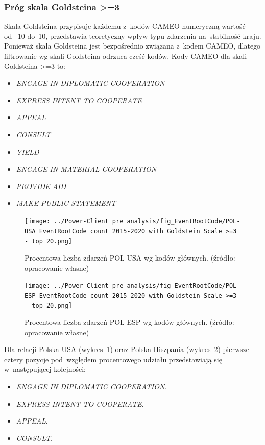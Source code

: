 \documentclass[11pt]{report}
\begin{document}
    \subsubsection{Próg skala Goldsteina >=3}
    Skala Goldsteina przypisuje każdemu z~kodów CAMEO numeryczną wartość od~-10 do~10, przedstawia teoretyczny wpływ typu zdarzenia na~stabilność kraju.
    Ponieważ skala Goldsteina jest bezpośrednio związana z~kodem CAMEO, dlatego filtrowanie wg skali Goldsteina odrzuca cześć kodów.
    Kody CAMEO dla skali Goldsteina >=3 to:
    \begin{itemize}
        \item \textit{ENGAGE IN DIPLOMATIC COOPERATION}
        \item \textit{EXPRESS INTENT TO COOPERATE}
        \item \textit{APPEAL}
        \item \textit{CONSULT}
        \item \textit{YIELD}
        \item \textit{ENGAGE IN MATERIAL COOPERATION}
        \item \textit{PROVIDE AID}
        \item \textit{MAKE PUBLIC STATEMENT}
    \end{itemize}

    \begin{figure}[tp]
        \centering
        \texttt{[image: ../Power-Client pre analysis/fig\_EventRootCode/POL-USA EventRootCode count 2015-2020 with Goldstein Scale >=3 - top 20.png]}
        \caption{Procentowa liczba zdarzeń POL-USA wg kodów głównych. (źródło: opracowanie własne)}
        \label{fig:Power-Client:ERC:Goldstein:POL-USA}
    \end{figure}


    \begin{figure}[tp]
        \centering
        \texttt{[image: ../Power-Client pre analysis/fig\_EventRootCode/POL-ESP EventRootCode count 2015-2020 with Goldstein Scale >=3 - top 20.png]}
        \caption{Procentowa liczba zdarzeń POL-ESP wg kodów głównych. (źródło: opracowanie własne)}
        \label{fig:Power-Client:ERC:Goldstein:POL-ESP}
    \end{figure}

    Dla relacji Polska-USA (wykres~\ref{fig:Power-Client:ERC:Goldstein:POL-USA}) oraz Polska-Hiszpania (wykres~\ref{fig:Power-Client:ERC:Goldstein:POL-ESP})
    pierwsze cztery pozycje pod~względem procentowego udziału przedstawiają się w~następującej kolejności:
    \begin{itemize}
        \item \textit{ENGAGE IN DIPLOMATIC COOPERATION}.
        \item \textit{EXPRESS INTENT TO COOPERATE}.
        \item \textit{APPEAL}.
        \item \textit{CONSULT}.
    \end{itemize}
\end{document}
